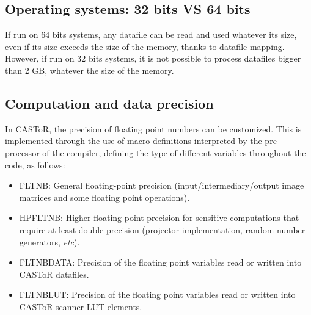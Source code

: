 \documentclass[a4paper, 11pt]{article}
\begin{document}
\subsection{Operating systems: 32 bits VS 64 bits}
\label{ss_install_os}

If run on 64 bits systems, any datafile can be read and used whatever its size, even if its size exceeds the size of the memory, thanks to datafile mapping.
However, if run on 32 bits systems, it is not possible to process datafiles bigger than 2 GB, whatever the size of the memory.

\subsection{Computation and data precision}
\label{ss_install_precision}

In CASToR, the precision of floating point numbers can be customized. This is implemented through the use of macro definitions interpreted by the pre-processor
of the compiler, defining the type of different variables throughout the code, as follows:

\begin{itemize}
  \item FLTNB: General floating-point precision (input/intermediary/output image matrices and some floating point operations).
  \item HPFLTNB: Higher floating-point precision for sensitive computations that require at least double precision (projector implementation, random number generators, \textit{etc}).
  \item FLTNBDATA: Precision of the floating point variables read or written into CASToR datafiles.
  \item FLTNBLUT: Precision of the floating point variables read or written into CASToR scanner LUT elements.
\end{itemize}
\end{document}
